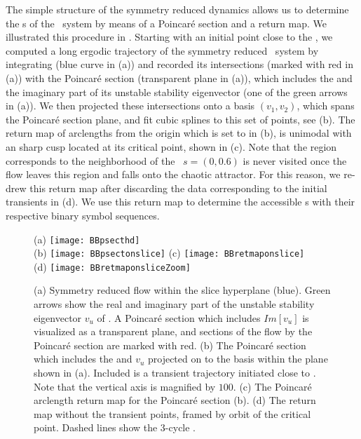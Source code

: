 The simple structure of the symmetry reduced dynamics allows us to determine the 
\rpo s of the \twomode\ system by means of a Poincar\'e section and a return map. We illustrated this procedure in . Starting with an initial
point close to the \REQV{}{}, we computed a long ergodic trajectory of the symmetry reduced \twomode\ system by integrating  (blue curve in  (a)) and recorded its intersections (marked with red in  (a)) with the Poincar\'e section (transparent plane in  (a)), which includes the \REQV{}{} and the imaginary part of its unstable stability eigenvector (one of the green arrows in  (a)). We then projected these intersections onto a
basis $(v_1, v_2)$, which spans the Poincar\'e section plane, and fit cubic splines to this set of points, see  (b). The return map of arclengths from the origin which is set to \REQV{}{} in  (b), is unimodal with an sharp cusp located at its critical point, shown in  (c). Note that the region corresponds to the neighborhood of the \reqv\ $s = (0, 0.6)$ is never visited once the flow leaves this region and falls onto the chaotic attractor. For this reason, we re-drew this return map after discarding the data corresponding to the initial transients in  (d). We use this return map to determine the accessible \rpo s  with their respective binary symbol sequences.

\begin{figure}
\centering
  (a) \texttt{[image: BBpsecthd]} \\
  (b) \texttt{[image: BBpsectonslice]}
  (c) \texttt{[image: BBretmaponslice]} \\
  (d) \texttt{[image: BBretmaponsliceZoom]}
\caption{(a) Symmetry reduced flow within the slice hyperplane (blue).
			Green arrows show the real and imaginary part of the unstable stability
			eigenvector $v_u$ of \REQV{}{}. A Poincar\'e section which includes
			$Im[v_u]$ is visualized as a transparent plane, and sections
			of the flow by the Poincar\'e section are marked with red.
		 (b) The Poincar\'e section which includes the \REQV{}{} and $v_u$ projected
			on to the basis within the plane shown in (a). Included is a
            transient trajectory initiated close to \REQV{}{}. Note that
		  	the vertical axis is magnified by $100$.
		 (c) The Poincar\'e arclength return map for the
		    Poincar\'e section (b).
		 (d) The return map without the transient points, framed by
            orbit of the critical point.
		 	Dashed lines show the 3-cycle .}
\label{fig:psectandretmap}
\end{figure}